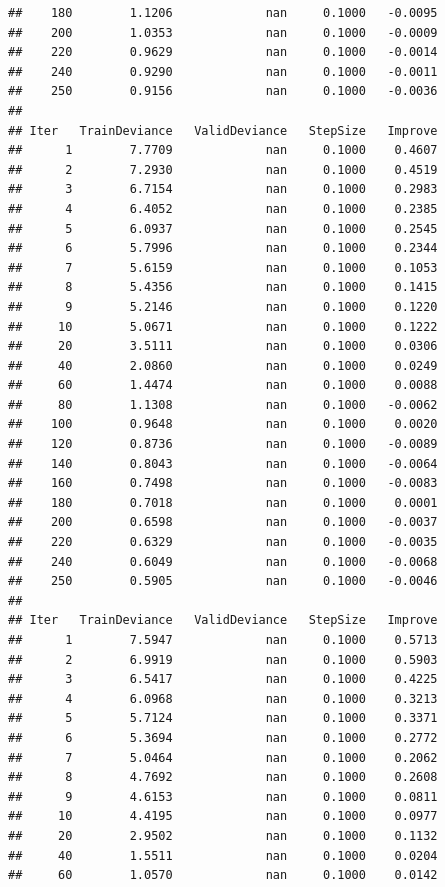 \documentclass[
]{book}
\begin{document}
\begin{verbatim}
##    180        1.1206             nan     0.1000   -0.0095
##    200        1.0353             nan     0.1000   -0.0009
##    220        0.9629             nan     0.1000   -0.0014
##    240        0.9290             nan     0.1000   -0.0011
##    250        0.9156             nan     0.1000   -0.0036
## 
## Iter   TrainDeviance   ValidDeviance   StepSize   Improve
##      1        7.7709             nan     0.1000    0.4607
##      2        7.2930             nan     0.1000    0.4519
##      3        6.7154             nan     0.1000    0.2983
##      4        6.4052             nan     0.1000    0.2385
##      5        6.0937             nan     0.1000    0.2545
##      6        5.7996             nan     0.1000    0.2344
##      7        5.6159             nan     0.1000    0.1053
##      8        5.4356             nan     0.1000    0.1415
##      9        5.2146             nan     0.1000    0.1220
##     10        5.0671             nan     0.1000    0.1222
##     20        3.5111             nan     0.1000    0.0306
##     40        2.0860             nan     0.1000    0.0249
##     60        1.4474             nan     0.1000    0.0088
##     80        1.1308             nan     0.1000   -0.0062
##    100        0.9648             nan     0.1000    0.0020
##    120        0.8736             nan     0.1000   -0.0089
##    140        0.8043             nan     0.1000   -0.0064
##    160        0.7498             nan     0.1000   -0.0083
##    180        0.7018             nan     0.1000    0.0001
##    200        0.6598             nan     0.1000   -0.0037
##    220        0.6329             nan     0.1000   -0.0035
##    240        0.6049             nan     0.1000   -0.0068
##    250        0.5905             nan     0.1000   -0.0046
## 
## Iter   TrainDeviance   ValidDeviance   StepSize   Improve
##      1        7.5947             nan     0.1000    0.5713
##      2        6.9919             nan     0.1000    0.5903
##      3        6.5417             nan     0.1000    0.4225
##      4        6.0968             nan     0.1000    0.3213
##      5        5.7124             nan     0.1000    0.3371
##      6        5.3694             nan     0.1000    0.2772
##      7        5.0464             nan     0.1000    0.2062
##      8        4.7692             nan     0.1000    0.2608
##      9        4.6153             nan     0.1000    0.0811
##     10        4.4195             nan     0.1000    0.0977
##     20        2.9502             nan     0.1000    0.1132
##     40        1.5511             nan     0.1000    0.0204
##     60        1.0570             nan     0.1000    0.0142

\end{verbatim}
\end{document}
